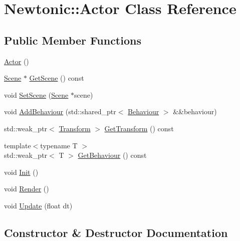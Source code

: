 \hypertarget{classNewtonic_1_1Actor}{}\section{Newtonic\+::Actor Class Reference}
\label{classNewtonic_1_1Actor}
\subsection*{Public Member Functions}
\begin{DoxyCompactItemize}
\item 
\mbox{\hyperlink{classNewtonic_1_1Actor_aa4ae151713495426ce9163c40d863b76}{Actor}} ()
\item 
\mbox{\hyperlink{classNewtonic_1_1Scene}{Scene}} $\ast$ \mbox{\hyperlink{classNewtonic_1_1Actor_ae08f7e9b9197e0aff9f9980535cfb0ee}{Get\+Scene}} () const
\item 
void \mbox{\hyperlink{classNewtonic_1_1Actor_a2520c978e52805a2d76cc8eb865abb88}{Set\+Scene}} (\mbox{\hyperlink{classNewtonic_1_1Scene}{Scene}} $\ast$scene)
\item 
void \mbox{\hyperlink{classNewtonic_1_1Actor_a49529a1eeaf7ade6db2b3656fd14d956}{Add\+Behaviour}} (std\+::shared\+\_\+ptr$<$ \mbox{\hyperlink{classNewtonic_1_1Behaviour}{Behaviour}} $>$ \&\&behaviour)
\item 
std\+::weak\+\_\+ptr$<$ \mbox{\hyperlink{classNewtonic_1_1Transform}{Transform}} $>$ \mbox{\hyperlink{classNewtonic_1_1Actor_a90648e3cc349aab45bae7ea043a181ec}{Get\+Transform}} () const
\item 
{\footnotesize template$<$typename T $>$ }\\std\+::weak\+\_\+ptr$<$ T $>$ \mbox{\hyperlink{classNewtonic_1_1Actor_aaad003203edfb935f16d572f8c3e2cbc}{Get\+Behaviour}} () const
\item 
void \mbox{\hyperlink{classNewtonic_1_1Actor_a6e0994c5bf019796f47b5bad78095d57}{Init}} ()
\item 
void \mbox{\hyperlink{classNewtonic_1_1Actor_af60303c39a4fe3dd3930d8351e432bc3}{Render}} ()
\item 
void \mbox{\hyperlink{classNewtonic_1_1Actor_addf35c24938904d5ac3baa82eac478d3}{Update}} (float dt)
\end{DoxyCompactItemize}


\subsection{Constructor \& Destructor Documentation}
\mbox{\label{classNewtonic_1_1Actor_aa4ae151713495426ce9163c40d863b76}} 
